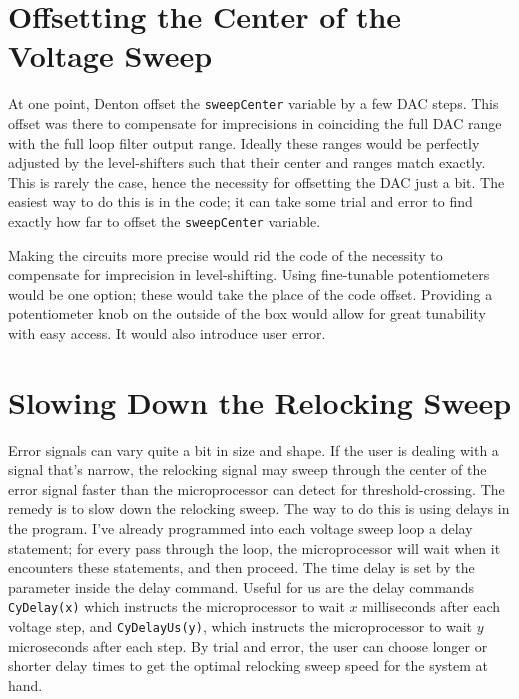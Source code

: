 \documentclass[10pt]{report}
\begin{document}
\section{Offsetting the Center of the Voltage Sweep}

At one point, Denton offset the \texttt{sweepCenter} variable by a few DAC steps. This offset was there to compensate for imprecisions in coinciding the full DAC range with the full loop filter output range. Ideally these ranges would be perfectly adjusted by the level-shifters such that their center and ranges match exactly. This is rarely the case, hence the necessity for offsetting the DAC just a bit. The easiest way to do this is in the code; it can take some trial and error to find exactly how far to offset the \texttt{sweepCenter} variable.

Making the circuits more precise would rid the code of the necessity to compensate for imprecision in level-shifting. Using fine-tunable potentiometers would be one option; these would take the place of the code offset. Providing a potentiometer knob on the outside of the box would allow for great tunability with easy access. It would also introduce user error.

\section{Slowing Down the Relocking Sweep}

Error signals can vary quite a bit in size and shape. If the user is dealing with a signal that's narrow, the relocking signal may sweep through the center of the error signal faster than the microprocessor can detect for threshold-crossing. The remedy is to slow down the relocking sweep. The way to do this is using delays in the program. I've already programmed into each voltage sweep loop a delay statement; for every pass through the loop, the microprocessor will wait when it encounters these statements, and then proceed. The time delay is set by the parameter inside the delay command. Useful for us are the delay commands \texttt{CyDelay(x)} which instructs the microprocessor to wait $x$ milliseconds after each voltage step, and \texttt{CyDelayUs(y)}, which instructs the microprocessor to wait $y$ microseconds after each step. By trial and error, the user can choose longer or shorter delay times to get the optimal relocking sweep speed for the system at hand.




\end{document}
